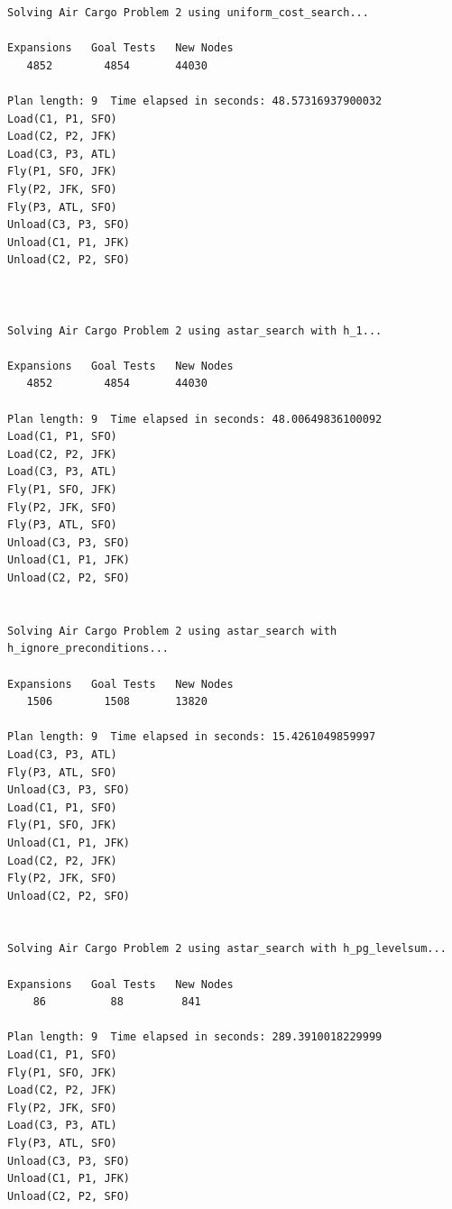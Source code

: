 \documentclass[10pt, a4paper,english]{article}
\begin{document}
\begin{lstlisting}
Solving Air Cargo Problem 2 using uniform_cost_search...

Expansions   Goal Tests   New Nodes
   4852        4854       44030   

Plan length: 9  Time elapsed in seconds: 48.57316937900032
Load(C1, P1, SFO)
Load(C2, P2, JFK)
Load(C3, P3, ATL)
Fly(P1, SFO, JFK)
Fly(P2, JFK, SFO)
Fly(P3, ATL, SFO)
Unload(C3, P3, SFO)
Unload(C1, P1, JFK)
Unload(C2, P2, SFO)



Solving Air Cargo Problem 2 using astar_search with h_1...

Expansions   Goal Tests   New Nodes
   4852        4854       44030   

Plan length: 9  Time elapsed in seconds: 48.00649836100092
Load(C1, P1, SFO)
Load(C2, P2, JFK)
Load(C3, P3, ATL)
Fly(P1, SFO, JFK)
Fly(P2, JFK, SFO)
Fly(P3, ATL, SFO)
Unload(C3, P3, SFO)
Unload(C1, P1, JFK)
Unload(C2, P2, SFO)


Solving Air Cargo Problem 2 using astar_search with h_ignore_preconditions...

Expansions   Goal Tests   New Nodes
   1506        1508       13820   

Plan length: 9  Time elapsed in seconds: 15.4261049859997
Load(C3, P3, ATL)
Fly(P3, ATL, SFO)
Unload(C3, P3, SFO)
Load(C1, P1, SFO)
Fly(P1, SFO, JFK)
Unload(C1, P1, JFK)
Load(C2, P2, JFK)
Fly(P2, JFK, SFO)
Unload(C2, P2, SFO)


Solving Air Cargo Problem 2 using astar_search with h_pg_levelsum...

Expansions   Goal Tests   New Nodes
    86          88         841    

Plan length: 9  Time elapsed in seconds: 289.3910018229999
Load(C1, P1, SFO)
Fly(P1, SFO, JFK)
Load(C2, P2, JFK)
Fly(P2, JFK, SFO)
Load(C3, P3, ATL)
Fly(P3, ATL, SFO)
Unload(C3, P3, SFO)
Unload(C1, P1, JFK)
Unload(C2, P2, SFO)


\end{lstlisting}
\end{document}
